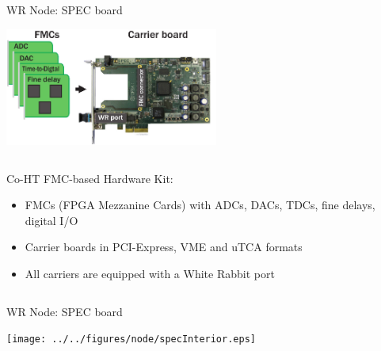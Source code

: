 \documentclass[compress,red]{beamer}
\begin{document}
\begin{frame}{WR Node: SPEC board}

    \begin{center}
    \includegraphics[width=7cm]{../../figures/node/shw_kit-1}
    \end{center}

  \begin{columns}[c]

	\begin{block}{Co-HT FMC-based Hardware Kit:}
	  \begin{itemize}
	  \item FMCs (FPGA Mezzanine Cards) with ADCs, DACs, TDCs, fine delays, digital I/O
	  \item Carrier boards in PCI-Express, VME and uTCA formats
	  \item All carriers are equipped with a White Rabbit port
	  \end{itemize}
	\end{block}

  \end{columns}


\end{frame}

\begin{frame}{WR Node: SPEC board}

    \begin{center}
    \texttt{[image: ../../figures/node/specInterior.eps]}
    \end{center}

\end{frame}
\end{document}
